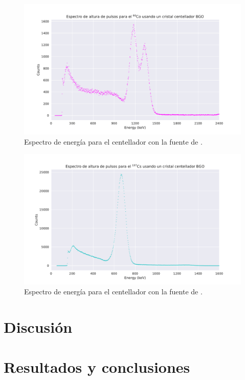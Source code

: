 \documentclass[12pt]{article}
\begin{document}
    \begin{figure}[!htb]
        \centering
        \includegraphics[scale = 0.7]{energy_spectrum_BGOCo.pdf}
        \caption{Espectro de energía para el centellador  con la fuente de .}
        \label{fig:bgoCoSpectrum}
    \end{figure}

    \begin{figure}[!htb]
        \centering
        \includegraphics[scale = 0.7]{energy_spectrum_BGOCs.pdf}
        \caption{Espectro de energía para el centellador  con la fuente de .}
        \label{fig:bgoCsSpectrum}
    \end{figure}

    \section*{Discusión}
    \kant[1-2]
    
    \section*{Resultados y conclusiones}
    \kant[1]
    
    \newpage
    \printbibliography
\end{document}
